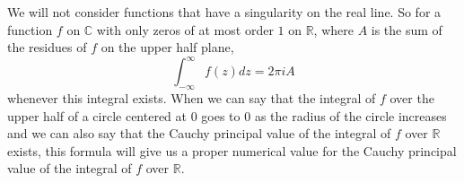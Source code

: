 We will not consider functions that have a singularity on the real line. So for a function $f$ on $\mathbb{C}$ with only zeros of at most order $1$ on $\mathbb{R}$, where $A$ is the sum of the residues of $f$ on the upper half plane,
\[\int_{-\infty}^{\infty} f(z) dz = 2\pi i A\]
whenever this integral exists.
When we can say that the integral of $f$ over the upper half of a circle centered at $0$ goes to $0$ as the radius of the circle increases and we can also say that the Cauchy principal value of the integral of $f$ over $\mathbb{R}$ exists, this formula will give us a proper numerical value for the Cauchy principal value of the integral of $f$ over $\mathbb{R}$.

